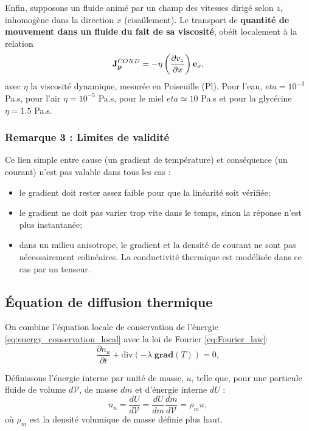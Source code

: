\documentclass[11pt,a4paper]{report}
\begin{document}
Enfin, supposons un fluide animé par un champ des vitesses dirigé selon $z$, inhomogène dans la direction $x$ (cisaillement). Le transport de \textbf{quantité de mouvement dans un fluide du fait de sa viscosité}, obéit localement à la relation
\begin{equation}
	\bold{J}_\bold{p}^{COND} = - \eta \left(\frac{\partial v_z}{\partial x} \right) \bold{e}_x,
\end{equation}
avec $\eta$ la viscosité dynamique, mesurée en Poiseuille (Pl). Pour l'eau, $eta = 10^{-3}$ Pa.s, pour l'air $\eta = 10^{-5}$ Pa.s, pour le miel $eta \simeq 10$ Pa.s et pour la glycérine $\eta = 1.5$ Pa.s.

\newpage

\subsubsection{Remarque 3 : Limites de validité}
Ce lien simple entre cause (un gradient de température) et conséquence (un courant) n'est pas valable dans tous les cas :
\begin{itemize}
	\item le gradient doit rester assez faible pour que la linéarité soit vérifiée;
	\item le gradient ne doit pas varier trop vite dans le temps, sinon la réponse n'est plus 				instantanée;
	\item dans un milieu anisotrope, le gradient et la densité de courant ne sont pas 						nécessairement colinéaires. La conductivité thermique est modélisée dans ce cas par un 				tenseur.
\end{itemize}

\subsection{Équation de diffusion thermique}

On combine l'équation locale de conservation de l'énergie \eqref{eq:energy_conservation_local} avec la loi de Fourier \eqref{eq:Fourier_law}:
\begin{equation}
	\frac{\partial n_u}{\partial t} + \text{div}\left(-\lambda\;\textbf{grad}(T)\right) = 0,
	\label{eq:combine_1}
\end{equation}

Définissons l'énergie interne par unité de masse, $u$, telle que, pour une particule fluide de volume $d\mathcal{V}$, de masse $dm$ et d'énergie interne $dU$ :
\begin{equation}
	n_u = \frac{dU}{d\mathcal{V}} = \frac{dU}{dm}\frac{dm}{d\mathcal{V}} = \rho_m u,
\end{equation}
où $\rho_m$ est la densité volumique de masse définie plus haut.
\end{document}
